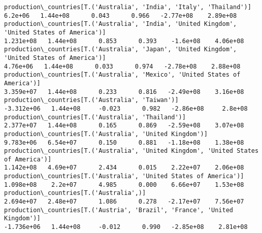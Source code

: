 \documentclass[11pt]{article}
\begin{document}
\begin{Verbatim}[commandchars=\\\{\}]
production\_countries[T.('Australia', 'India', 'Italy', 'Thailand')]                                                                                                                      6.2e+06   1.44e+08      0.043      0.966   -2.77e+08    2.89e+08
production\_countries[T.('Australia', 'India', 'United Kingdom', 'United States of America')]                                                                                           1.231e+08   1.44e+08      0.853      0.393    -1.6e+08    4.06e+08
production\_countries[T.('Australia', 'Japan', 'United Kingdom', 'United States of America')]                                                                                            4.76e+06   1.44e+08      0.033      0.974   -2.78e+08    2.88e+08
production\_countries[T.('Australia', 'Mexico', 'United States of America')]                                                                                                            3.359e+07   1.44e+08      0.233      0.816   -2.49e+08    3.16e+08
production\_countries[T.('Australia', 'Taiwan')]                                                                                                                                       -3.312e+06   1.44e+08     -0.023      0.982   -2.86e+08     2.8e+08
production\_countries[T.('Australia', 'Thailand')]                                                                                                                                      2.377e+07   1.44e+08      0.165      0.869   -2.59e+08    3.07e+08
production\_countries[T.('Australia', 'United Kingdom')]                                                                                                                                9.783e+06   6.54e+07      0.150      0.881   -1.18e+08    1.38e+08
production\_countries[T.('Australia', 'United Kingdom', 'United States of America')]                                                                                                    1.142e+08   4.69e+07      2.434      0.015    2.22e+07    2.06e+08
production\_countries[T.('Australia', 'United States of America')]                                                                                                                      1.098e+08    2.2e+07      4.985      0.000    6.66e+07    1.53e+08
production\_countries[T.('Australia',)]                                                                                                                                                 2.694e+07   2.48e+07      1.086      0.278   -2.17e+07    7.56e+07
production\_countries[T.('Austria', 'Brazil', 'France', 'United Kingdom')]                                                                                                             -1.736e+06   1.44e+08     -0.012      0.990   -2.85e+08    2.81e+08

\end{Verbatim}
\end{document}
